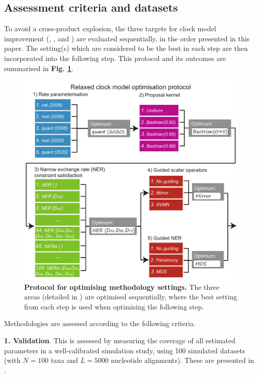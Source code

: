 \documentclass[10pt,letterpaper]{article}
\begin{document}
\subsection*{Assessment criteria and datasets}




To avoid a cross-product explosion, the three targets for clock model improvement (\textbf{}, \textbf{}, and \textbf{}) are evaluated sequentially, in the order presented in this paper. The setting(s) which are considered to be the best in each step are then incorporated into the following step. This protocol and its outcomes are summarised in \textbf{Fig. \ref{fig:tournament}}.

\begin{figure}[!h]
\includegraphics[width=\textwidth]{Figures/tournament.pdf}
\caption{\textbf{Protocol for optimising methodology settings.} The three areas (detailed in \textbf{}) are optimised sequentially, where the best setting from each step is used when optimising the following step.}
\label{fig:tournament}
\end{figure}


Methodologies are assessed according to the following criteria.


\textbf{1. Validation}. This is assessed by measuring the coverage of all estimated parameters in a well-calibrated simulation study, using 100 simulated datasets (with $N=100$ taxa and $L=5000$ nucleotide alignments). These are presented in \textbf{}. \\
\end{document}
